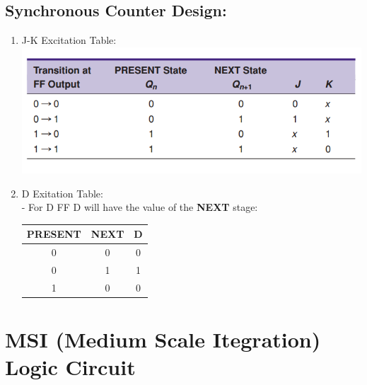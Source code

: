\documentclass[12pt]{article}
\begin{document}
\subsection{Synchronous Counter Design:}
\begin{enumerate}
    \item J-K Excitation Table: \\
    \includegraphics[scale = 0.7]{hinh62}
    \bigbreak
    \item D Exitation Table: \\
    - For D FF D will have the value of the \textbf{NEXT} stage: \\
    \begin{tabular}{|c|c|c|}
    \hline
    PRESENT & NEXT & D \\
    \hline
     0 & 0 & 0 \\
     \hline
     0 & 1 & 1 \\
     \hline
     1 & 0 & 0 \\
     \hline
    \end{tabular}
\end{enumerate}

\section{MSI (Medium Scale Itegration) Logic Circuit}
\end{document}
